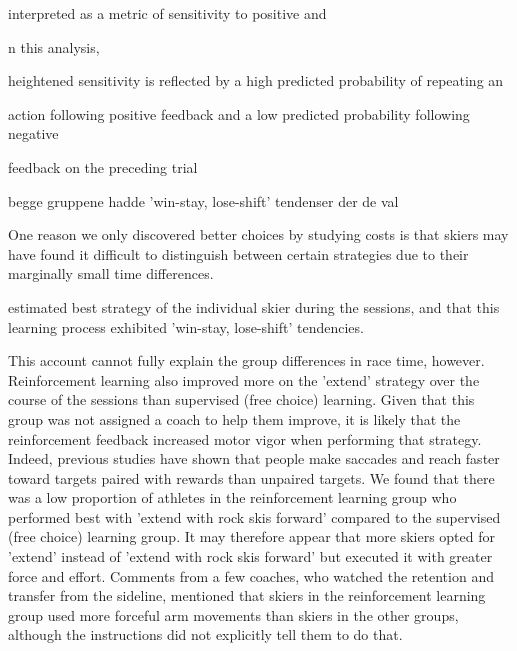 \documentclass[pdflatex,sn-mathphys-num]{sn-jnl}%
\theoremstyle{thmstyleone}%
\theoremstyle{thmstyletwo}%
\theoremstyle{thmstylethree}%
\begin{document}
interpreted as a metric of sensitivity to positive and 


n this analysis,

heightened sensitivity is reflected by a high predicted probability of repeating an

action following positive feedback and a low predicted probability following negative

feedback on the preceding trial 


begge gruppene hadde 'win-stay, lose-shift' tendenser der de val 







One reason we only discovered better choices by studying costs is that skiers may have found it difficult to distinguish between certain strategies due to their marginally small time differences.





estimated best strategy of the individual skier during the sessions, and that this learning process exhibited 'win-stay, lose-shift' tendencies. 







This account cannot fully explain the group differences in race time, however. Reinforcement learning also improved more on the 'extend' strategy over the course of the sessions than supervised (free choice) learning. Given that this group was not assigned a coach to help them improve, it is likely that the reinforcement feedback increased motor vigor \cite{shadmehr_vigor_2020, pietro_mazzoni_why_2007, niv_normative_2006} when performing that strategy. Indeed, previous studies have shown that people make saccades \cite{takikawa_modulation_2002} and reach faster \cite{summerside_vigor_2018} toward targets paired with rewards than unpaired targets. We found that there was a low proportion of athletes in the reinforcement learning group who performed best with 'extend with rock skis forward' compared to the supervised (free choice) learning group. It may therefore appear that more skiers opted for 'extend' instead of 'extend with rock skis forward' but executed it with greater force and effort. Comments from a few coaches, who watched the retention and transfer from the sideline, mentioned that skiers in the reinforcement learning group used more forceful arm movements than skiers in the other groups, although the instructions did not explicitly tell them to do that.
\end{document}
